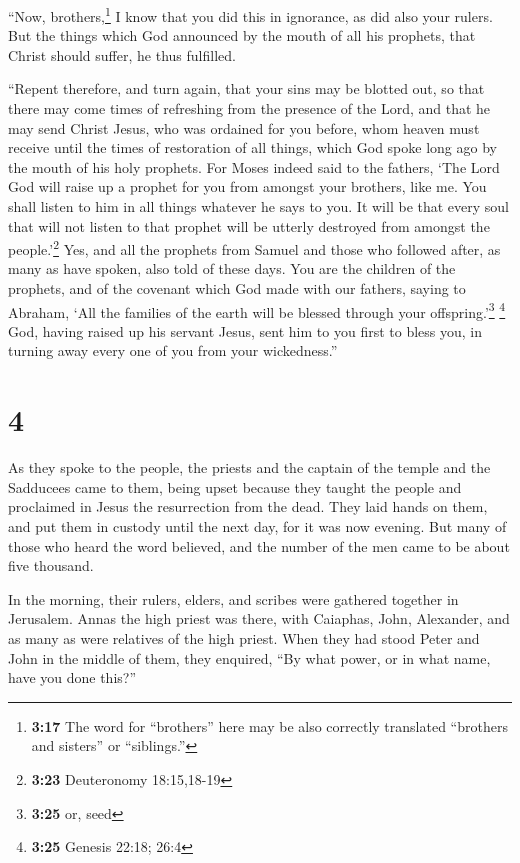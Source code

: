  ``Now, brothers,\footnote{\textbf{3:17} The word for
  ``brothers'' here may be also correctly translated ``brothers and
  sisters'' or ``siblings.''} I know that you did this in ignorance, as
did also your rulers.  But the things which God announced
by the mouth of all his prophets, that Christ should suffer, he thus
fulfilled.

 ``Repent therefore, and turn again, that your sins may
be blotted out, so that there may come times of refreshing from the
presence of the Lord,  and that he may send Christ Jesus,
who was ordained for you before,  whom heaven must
receive until the times of restoration of all things, which God spoke
long ago by the mouth of his holy prophets.  For Moses
indeed said to the fathers, `The Lord God will raise up a prophet for
you from amongst your brothers, like me. You shall listen to him in all
things whatever he says to you.  It will be that every
soul that will not listen to that prophet will be utterly destroyed from
amongst the people.'\footnote{\textbf{3:23} Deuteronomy 18:15,18-19}
 Yes, and all the prophets from Samuel and those who
followed after, as many as have spoken, also told of these days.
 You are the children of the prophets, and of the
covenant which God made with our fathers, saying to Abraham, `All the
families of the earth will be blessed through your
offspring.'\footnote{\textbf{3:25} or, seed} \footnote{\textbf{3:25}
  Genesis 22:18; 26:4}  God, having raised up his servant
Jesus, sent him to you first to bless you, in turning away every one of
you from your wickedness.''

\hypertarget{section-3}{%
\section{4}\label{section-3}}

 As they spoke to the people, the priests and the captain
of the temple and the Sadducees came to them,  being upset
because they taught the people and proclaimed in Jesus the resurrection
from the dead.  They laid hands on them, and put them in
custody until the next day, for it was now evening.  But
many of those who heard the word believed, and the number of the men
came to be about five thousand.

 In the morning, their rulers, elders, and scribes were
gathered together in Jerusalem.  Annas the high priest was
there, with Caiaphas, John, Alexander, and as many as were relatives of
the high priest.  When they had stood Peter and John in
the middle of them, they enquired, ``By what power, or in what name,
have you done this?''

